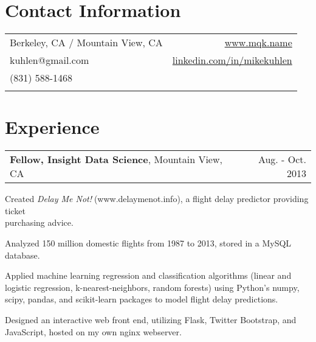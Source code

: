 \begin{resume}

\vspace*{0.15in}

\section{\sc Contact Information}
\vspace*{.05in}
\begin{tabularx}{\textwidth}{Xr}
Berkeley, CA / Mountain View, CA         & \url{www.mqk.name} \\
kuhlen@gmail.com                         & \url{linkedin.com/in/}$\!$\url{mikekuhlen} \\
(831) 588-1468 \\                        & \\
\end{tabularx}

\vspace*{-0.15in}
\section{\sc Experience}
\hspace*{-0.1in}
\begin{tabularx}{1.025\textwidth}{Xr}
\textbf{Fellow, Insight Data Science}, Mountain View, CA & Aug. - Oct. 2013
\end{tabularx}
\vspace*{-0.1in}
\begin{list1}
\item Created \textit{Delay Me Not!}$\;$(www.delaymenot.info), a flight delay predictor providing ticket \\ purchasing advice.
\item Analyzed 150 million domestic flights from 1987 to 2013, stored in a MySQL database.
\item Applied machine learning regression and classification algorithms (linear and logistic regression, k-nearest-neighbors, random forests) using Python's numpy, scipy, pandas, and scikit-learn packages to model flight delay predictions.
\item Designed an interactive web front end, utilizing Flask, Twitter Bootstrap, and JavaScript, hosted on my own nginx webserver.
\end{list1}


\end{resume}
